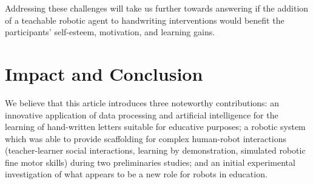 \documentclass{sig-alternate}
\begin{document}
Addressing these challenges will take us further towards answering if the
addition of a teachable robotic agent to handwriting interventions would benefit
the participants' self-esteem, motivation, and learning gains.


%

%


\addtolength{\textheight}{-6.3cm}   %

\section{Impact and Conclusion}\label{sec:conclusions}

We believe that this article introduces three noteworthy contributions: an
innovative application of data processing and artificial intelligence for the
learning of hand-written letters suitable for educative purposes; a robotic
system which was able to provide scaffolding for complex human-robot
interactions (teacher-learner social interactions, learning by demonstration,
simulated robotic fine motor skills) during two preliminaries studies; and an
initial experimental investigation of what appears to be a new role for robots
in education.
\end{document}
